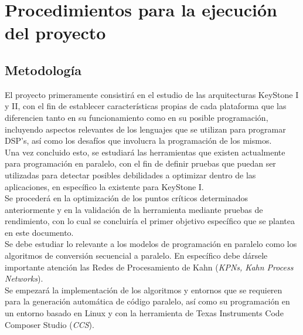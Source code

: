 
\chapter{Procedimientos para la ejecución del proyecto}
\label{ch:Procedimientos_para_la_ejecucion_del_proyecto}

\section{Metodología}

El proyecto primeramente consistirá en el estudio de las arquitecturas
KeyStone I y II, con el fin de establecer características propias de cada
plataforma que las diferencien tanto en su funcionamiento como en su posible
programación, incluyendo aspectos relevantes de los lenguajes que se utilizan
para programar DSP's, así como los desafíos que involucra la programación de los mismos.\\

Una vez concluido esto, se estudiará las herramientas que existen actualmente para programación en paralelo, 
con el fin de definir pruebas que puedan ser utilizadas para detectar posibles debilidades a optimizar 
dentro de las aplicaciones, en específico la existente para \newline KeyStone I.\\

Se procederá en la optimización de los puntos críticos determinados anteriormente 
y en la validación de la herramienta mediante pruebas de rendimiento, con lo cual se concluiría 
el primer objetivo específico que se plantea en este documento.\\

Se debe estudiar lo relevante a los modelos de programación en paralelo como los algoritmos
de conversión secuencial a paralelo. En específico debe dársele 
importante atención las Redes de Procesamiento de Kahn (\textit{KPNs, Kahn Process Networks}).\\

Se empezará la implementación de los algoritmos y entornos que se requieren para la generación automática
de código paralelo, así como su programación en un entorno
basado en Linux y con la herramienta de Texas Instruments Code Composer Studio (\textit{CCS}).\\

